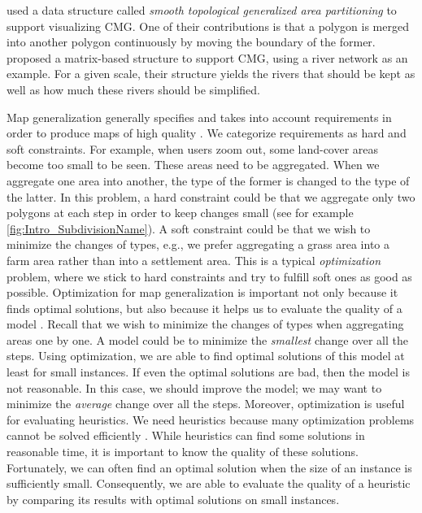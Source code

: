 \Textcite{vanOosterom2014tGAP} used
a data structure called
\emph{smooth topological generalized area partitioning}
to support visualizing CMG.
One of their contributions is that
a polygon is merged into another polygon continuously
by moving the boundary of the former.
\textcite{Huang2017Matrix} proposed a matrix-based structure 
to support CMG,
using a river network as an example.
For a given scale, 
their structure yields the rivers that should be kept 
as well as how much these rivers should be simplified.



Map generalization generally specifies 
and takes into account requirements
in order to produce maps of high quality
\parencite{Stoter2009Requirements}.
We categorize requirements as hard and soft constraints.
For example, when users zoom out, 
some land-cover areas become too small to be seen.
These areas need to be aggregated.
When we aggregate one area into another, 
the type of the former is changed to the type of the latter. 
In this problem, a hard constraint could be that 
we aggregate only two polygons at each step 
in order to keep changes small
(see for example \fig\ref{fig:Intro_SubdivisionName}). 
A soft constraint could be that 
we wish to minimize the changes of types, e.g., 
we prefer aggregating a grass area into a farm area 
rather than into a settlement area.
This is a typical \emph{optimization} problem,
where we stick to hard constraints and 
try to fulfill soft ones as good as possible.
Optimization for map generalization is important 
not only because it finds optimal solutions,
but also because it helps us to evaluate the quality of a model
\parencite{Haunert2017Label,
Haunert2008Assuring,Haunert2016Optimization}.
Recall that we wish to minimize the changes of types
when aggregating areas one by one.
A model could be to minimize 
the \emph{smallest} change over all the steps.
Using optimization, we are able to find optimal solutions
of this model at least for small instances.
If even the optimal solutions are bad,
then the model is not reasonable.
In this case, we should improve the model; 
we may want to minimize 
the \emph{average} change over all the steps.
Moreover, optimization is useful for evaluating heuristics.
We need heuristics because
many optimization problems cannot be solved efficiently
\parencite[e.g.,][]{HaunertWolff2010AreaAgg,Haunert2016Partition}.
While heuristics can find some solutions in reasonable time,
it is important to know the quality of 
these solutions.
Fortunately, we can often find an optimal solution when 
the size of an instance is sufficiently small.
Consequently, we are able to evaluate 
the quality of a heuristic 
by comparing its results with optimal solutions
on small instances.


